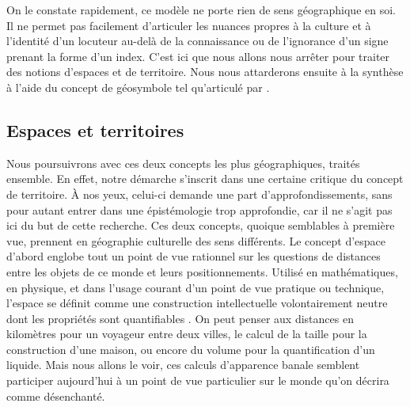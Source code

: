 On le constate rapidement, ce modèle ne porte  rien de sens géographique en soi. 
Il ne permet pas facilement d'articuler les nuances propres à la culture et à l'identité d'un locuteur au-delà de la connaissance ou de l'ignorance d'un signe prenant la forme d'un index. 
C'est ici que nous allons nous arrêter pour traiter des notions d'espaces et de territoire. 
Nous nous attarderons ensuite à la synthèse à l'aide du concept de géosymbole tel qu'articulé par \citet{Bonnemaison1981}.


\subsection{Espaces et territoires}
\label{sec:espaces_et_territoires} Nous poursuivrons avec ces deux concepts les plus géographiques, traités ensemble. 
En effet, notre démarche s'inscrit dans une certaine critique du concept de territoire.
À nos yeux, celui-ci demande une part d'approfondissements,  sans pour autant entrer dans une épistémologie trop approfondie, car il ne s'agit pas ici du but de cette recherche. 
Ces deux concepts, quoique semblables à première vue, prennent en géographie culturelle des sens différents. 
Le concept d'espace d'abord englobe  tout un point de vue rationnel sur les questions de distances entre les objets de ce monde et leurs positionnements.
Utilisé en mathématiques, en physique, et dans l'usage courant d'un point de vue pratique ou technique, l'espace se définit comme une construction intellectuelle volontairement neutre dont les propriétés sont quantifiables .
On peut penser aux distances en kilomètres pour un voyageur entre deux villes, le calcul de la taille pour la construction d'une maison, ou encore du volume pour la quantification d'un liquide. 
Mais nous allons le voir, ces calculs d'apparence banale semblent participer aujourd'hui à un point de vue particulier sur le monde qu'on décrira comme désenchanté.

